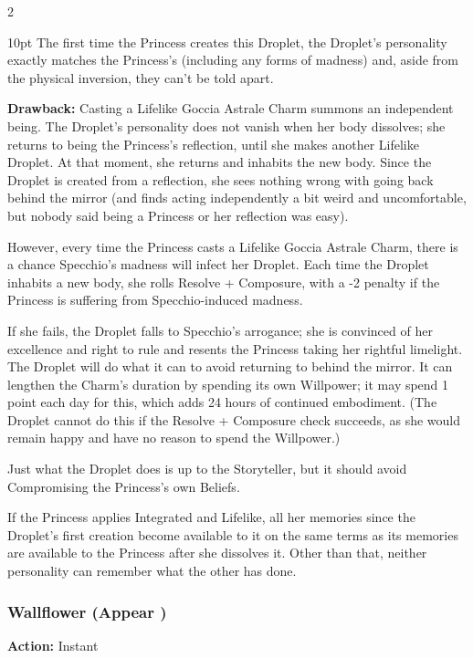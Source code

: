 \begin{multicols}{2}
\begin{myindentpar}{10pt}
The first time the Princess creates this Droplet, the Droplet's personality exactly matches the Princess's (including any forms of madness) and, aside from the physical inversion, they can't be told apart.

\textbf{Drawback:} Casting a Lifelike Goccia Astrale Charm summons an independent being. The Droplet's personality does not vanish when her body dissolves; she returns to being the Princess's reflection, until she makes another Lifelike Droplet. At that moment, she returns and inhabits the new body. Since the Droplet is created from a reflection, she sees nothing wrong with going back behind the mirror (and finds acting independently a bit weird and uncomfortable, but nobody said being a Princess or her reflection was easy). 

However, every time the Princess casts a Lifelike Goccia Astrale Charm, there is a chance Specchio's madness will infect her Droplet. Each time the Droplet inhabits a new body, she rolls Resolve + Composure, with a -2 penalty if the Princess is suffering from Specchio-induced madness. 

If she fails, the Droplet falls to Specchio's arrogance; she is convinced of her excellence and right to rule and resents the Princess taking her rightful limelight. The Droplet will do what it can to avoid returning to behind the mirror. It can lengthen the Charm's duration by spending its own Willpower; it may spend 1 point each day for this, which adds 24 hours of continued embodiment. (The Droplet cannot do this if the Resolve + Composure check succeeds, as she would remain happy and have no reason to spend the Willpower.) 

Just what the Droplet does is up to the Storyteller, but it should avoid Compromising the Princess's own Beliefs.

If the Princess applies Integrated and Lifelike, all her memories since the Droplet's first creation become available to it on the same terms as its memories are available to the Princess after she dissolves it. Other than that, neither personality can remember what the other has done.\end{myindentpar}

\subsubsection*{Wallflower (Appear \textbullet\textbullet\textbullet)}
\noindent \textbf{Action:} Instant


\end{multicols}
